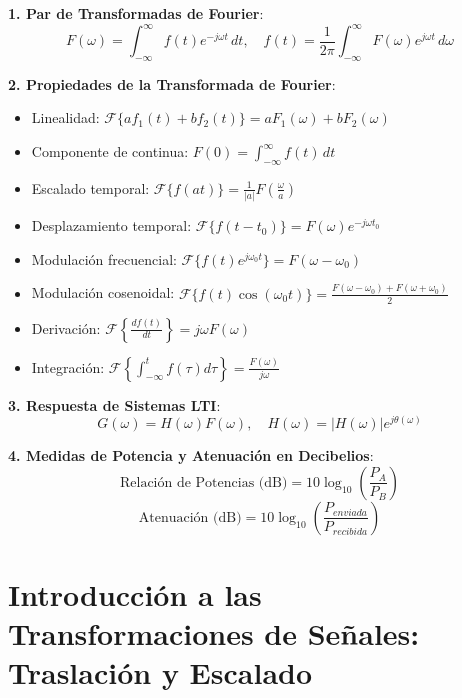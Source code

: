\begin{tcolorbox}[cajaFormulario, title={Formulario General: Transformada de Fourier y Sistemas LTI}]
\textbf{1. Par de Transformadas de Fourier}:
\[
F(\omega) = \int_{-\infty}^{\infty} f(t) e^{-j\omega t} \, dt, \quad f(t) = \frac{1}{2\pi} \int_{-\infty}^{\infty} F(\omega) e^{j\omega t} \, d\omega
\]

\textbf{2. Propiedades de la Transformada de Fourier}:
\begin{itemize}[leftmargin=*]
    \item Linealidad: $\mathcal{F}\{a f_1(t) + b f_2(t)\} = a F_1(\omega) + b F_2(\omega)$
    \item Componente de continua: $F(0) = \int_{-\infty}^{\infty} f(t) \, dt$
    \item Escalado temporal: $\mathcal{F}\{f(at)\} = \frac{1}{|a|} F\left(\frac{\omega}{a}\right)$
    \item Desplazamiento temporal: $\mathcal{F}\{f(t - t_0)\} = F(\omega) e^{-j \omega t_0}$
    \item Modulación frecuencial: $\mathcal{F}\{f(t) e^{j \omega_0 t}\} = F(\omega - \omega_0)$
    \item Modulación cosenoidal: $\mathcal{F}\{f(t) \cos(\omega_0 t)\} = \frac{F(\omega - \omega_0) + F(\omega + \omega_0)}{2}$
    \item Derivación: $\mathcal{F}\left\{\frac{df(t)}{dt}\right\} = j \omega F(\omega)$
    \item Integración: $\mathcal{F}\left\{\int_{-\infty}^{t} f(\tau) d\tau\right\} = \frac{F(\omega)}{j\omega}$
\end{itemize}

\textbf{3. Respuesta de Sistemas LTI}:
\[
G(\omega) = H(\omega) F(\omega), \quad H(\omega) = |H(\omega)| e^{j\theta(\omega)}
\]

\textbf{4. Medidas de Potencia y Atenuación en Decibelios}:
\[
\text{Relación de Potencias (dB)} = 10 \log_{10}\left(\frac{P_A}{P_B}\right)
\]
\[
\text{Atenuación (dB)} = 10 \log_{10}\left(\frac{P_{enviada}}{P_{recibida}}\right)
\]
\end{tcolorbox}

\newpage

\section{Introducción a las Transformaciones de Señales: Traslación y Escalado}

